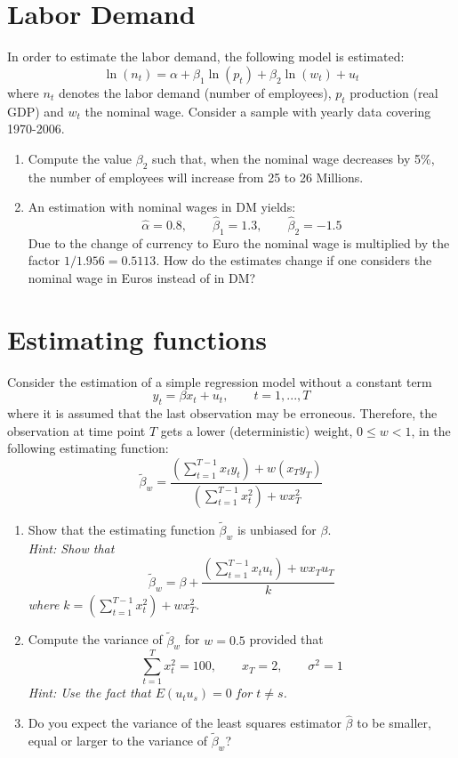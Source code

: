 \documentclass{article}
\begin{document}
\section{Labor Demand}
In order to estimate the labor demand, the following model is estimated:
$$ \ln(n_t) = \alpha + \beta_1 \ln(p_t) + \beta_2 \ln(w_t) + u_t$$
where $n_t$ denotes the labor demand (number of employees), $p_t$ production (real GDP) and $w_t$ the nominal wage. Consider a sample with yearly data covering 1970-2006.
\begin{enumerate}[label=(\alph*)]
	\item Compute the value $\beta_2$ such that, when the nominal wage decreases by 5\%, the number of employees will increase from 25 to 26 Millions.
	\item An estimation with nominal wages in DM yields: 
	$$\hat{\alpha} = 0.8, \qquad \hat{\beta}_1 = 1.3, \qquad \hat{\beta}_2 = -1.5$$
	Due to the change of currency to Euro the nominal wage is multiplied by the factor $1/1.956=0.5113$. How do the estimates change if one considers the nominal wage in Euros instead of in DM?
\end{enumerate}


\newpage
\section{Estimating functions}
Consider the estimation of a simple regression model without a constant term
$$y_t = \beta x_t + u_t, \qquad t=1,...,T$$
where it is assumed that the last observation may be erroneous. Therefore, the observation at time point $T$ gets a lower (deterministic) weight, $0 \leq w <1$, in the following estimating function:
$$\tilde{\beta}_w = \frac{\left(\sum_{t=1}^{T-1}x_t y_t\right)+w (x_T y_T)}{\left(\sum_{t=1}^{T-1}x_t^2\right)+w x_T^2}$$
\begin{enumerate}[label=(\alph*)]
	\item Show that the estimating function $\tilde{\beta}_w$ is unbiased for $\beta$.\\
\textit{	Hint: Show that
	$$\tilde{\beta}_w = \beta + \frac{(\sum_{t=1}^{T-1}x_t u_t)+w x_T u_T}{k}$$ where $k=(\sum_{t=1}^{T-1}x_t^2)+w x_T^2$.} 
	\item Compute the variance of $\tilde{\beta}_w$ for $w=0.5$ provided that
	$$ \sum_{t=1}^{T} x_t^2 = 100,\qquad x_T = 2,\qquad \sigma^2 = 1$$
	\textit{Hint: Use the fact that $E(u_t u_s)=0$ for $t\neq s$.}
	\item Do you expect the variance of the least squares estimator  $\hat{\beta}$ to be smaller, equal or larger to the variance of $\tilde{\beta}_w$?
\end{enumerate}
\newpage
	
\end{document}
